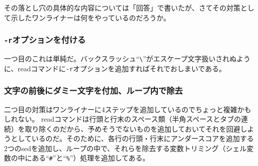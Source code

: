その落とし穴の具体的な内容については「回答」で書いたが、さてその対策として示したワンライナーは何をやっているのだろうか。
\subsubsection*{\verb|-r|オプションを付ける}

一つ目のこれは単純だ。バックスラッシュ``\verb|\|''がエスケープ文字扱いされぬように、readコマンドに\verb|-r|オプションを追加すればそれでおしまいである。

\subsubsection*{文字の前後にダミー文字を付加、ループ内で除去}

二つ目の対策はワンライナーに4ステップを追加しているのでちょっと複雑かもしれない。
readコマンドは行頭と行末のスペース類（半角スペースとタブの連続）を取り除くのだから、予めそうでないものを追加しておいてそれを回避しようとしているのだ。そのために、各行の行頭・行末にアンダースコアを追加する2つのsedを追加し、ループの中で、それらを除去する変数トリミング（シェル変数の中にある``\verb|#|''と``\verb|%|''）処理を追加してある。
